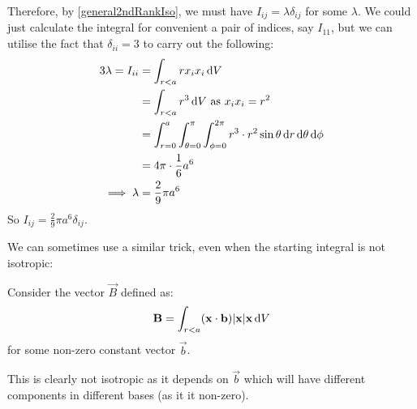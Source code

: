 \documentclass[../main.tex]{subfiles}
\begin{document}
Therefore, by \cref{general2ndRankIso}, we must have $I_{i j} = \lambda \delta_{i j}$ for some $\lambda$.
We could just calculate the integral for convenient a pair of indices, say $I_{1 1}$, but we can utilise the fact that $\delta_{i i} = 3$ to carry out the following:
\begin{align*}
  3\lambda = I_{i i} &= \int_{r < a} rx_ix_i \d{V} \\
                     &= \int_{r < a} r^3 \d{V} \text{ as $x_ix_i = r^2$} \\
                     &= \int_{r = 0}^{a} \int_{\theta = 0}^{\pi} \int_{\phi = 0}^{2\pi} r^3 \cdot r^2 \sin \theta \d{r} \d{\theta} \d{\phi} \\
                     &= 4\pi \cdot \frac{1}{6}a^6 \\
  \implies \lambda &= \frac{2}{9}\pi a^{6}
\end{align*}
So $I_{i j} = \frac{2}{9}\pi a^{6} \delta_{i j}$.

We can sometimes use a similar trick, even when the starting integral is not isotropic:
\begin{remark}[Extension]
  Consider the vector $\vec{B}$ defined as:
  \[
    \vec{B} = \int_{r < a}  (\vec{x} \cdot \vec{b})|\vec{x}|\vec{x} \d{V}
  \]
  for some non-zero constant vector $\vec{b}$.
\end{remark}
This is clearly not isotropic as it depends on $\vec{b}$ which will have different components in different bases (as it it non-zero).
\end{document}
